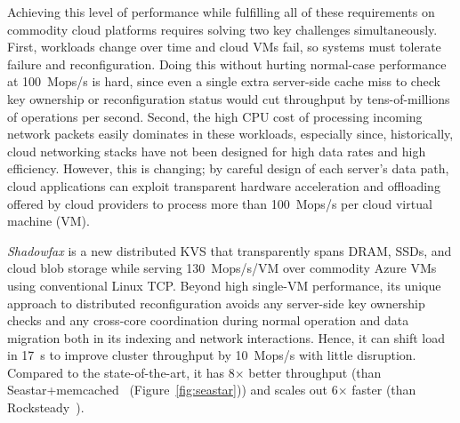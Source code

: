 Achieving this level of performance while fulfilling all of these
requirements on commodity cloud platforms requires solving two key challenges
simultaneously.
%
First, workloads change over time and cloud VMs fail, so systems must tolerate
failure and reconfiguration.
%
Doing this without hurting normal-case performance at 100~Mops/s is hard, since
even a single extra server-side cache miss to check key ownership or
reconfiguration status would cut throughput by tens-of-millions of operations
per second.
%
Second, the high CPU cost of processing incoming network
packets easily dominates in these workloads,
especially since, historically, cloud networking stacks have not been designed
for high data rates and high efficiency.
%
However, this is changing; by careful design of each server's data path, cloud
applications can exploit transparent hardware acceleration and offloading
offered by cloud providers to process more than 100~Mops/s per cloud virtual
machine (VM).

\emph{Shadowfax} is a new distributed KVS that transparently
spans DRAM, SSDs, and cloud blob storage while serving 130~Mops/s/VM over
commodity Azure VMs~\cite{azure} using conventional Linux TCP.
%
Beyond high single-VM performance, its unique approach to
distributed reconfiguration avoids any server-side key ownership checks
and any cross-core coordination during
normal operation and data migration both in its indexing and network interactions.
%
Hence,
it can shift load in 17~s to improve cluster throughput by
10~Mops/s
with little disruption.
%
Compared to the state-of-the-art, it has 8$\times{}$ better throughput (than
Seastar+memcached~\cite{seastar}
(Figure~\ref{fig:seastar})) and scales out 6$\times{}$ faster (than
Rocksteady~\cite{rocksteady}).



